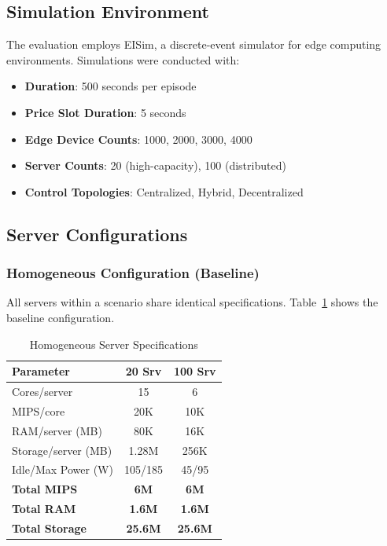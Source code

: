 \documentclass[conference]{IEEEtran}
\begin{document}
\subsection{Simulation Environment}

The evaluation employs EISim, a discrete-event simulator for edge computing environments. Simulations were conducted with:
\begin{itemize}
    \item \textbf{Duration}: 500 seconds per episode
    \item \textbf{Price Slot Duration}: 5 seconds
    \item \textbf{Edge Device Counts}: 1000, 2000, 3000, 4000
    \item \textbf{Server Counts}: 20 (high-capacity), 100 (distributed)
    \item \textbf{Control Topologies}: Centralized, Hybrid, Decentralized
\end{itemize}

\subsection{Server Configurations}

\subsubsection{Homogeneous Configuration (Baseline)}

All servers within a scenario share identical specifications. Table~\ref{tab:homo_specs} shows the baseline configuration.

\begin{table}[H]
\centering
\caption{Homogeneous Server Specifications}
\label{tab:homo_specs}
\footnotesize
\begin{tabular}{@{}lcc@{}}
\toprule
\textbf{Parameter} & \textbf{20 Srv} & \textbf{100 Srv} \\
\midrule
Cores/server & 15 & 6 \\
MIPS/core & 20K & 10K \\
RAM/server (MB) & 80K & 16K \\
Storage/server (MB) & 1.28M & 256K \\
Idle/Max Power (W) & 105/185 & 45/95 \\
\midrule
\textbf{Total MIPS} & \textbf{6M} & \textbf{6M} \\
\textbf{Total RAM} & \textbf{1.6M} & \textbf{1.6M} \\
\textbf{Total Storage} & \textbf{25.6M} & \textbf{25.6M} \\
\bottomrule
\end{tabular}
\end{table}
\end{document}
